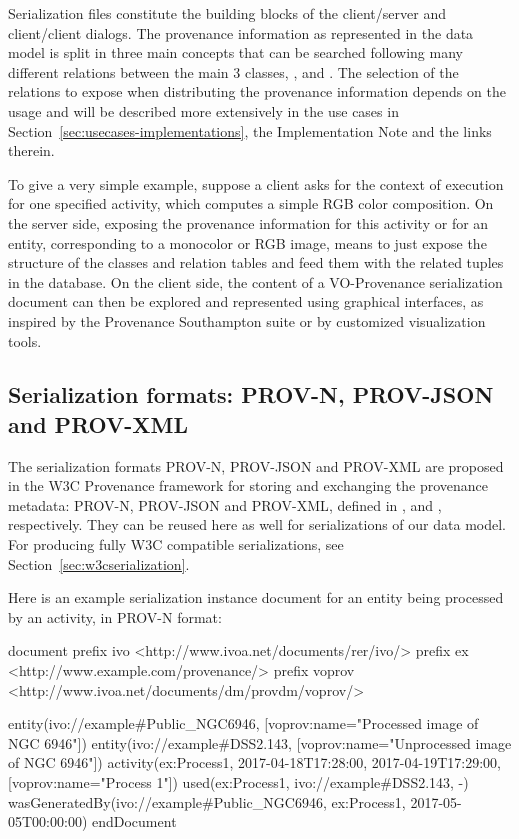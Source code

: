 Serialization files constitute the building blocks of the client/server and client/client dialogs.
The provenance information as represented in the data model is split in three main concepts that can be searched following many different relations between the main 3 classes, ,  and .
The selection of the relations to expose when distributing the provenance information depends on the usage and will be described more extensively in the use cases in Section~\ref{sec:usecases-implementations}, the Implementation Note \citep{std:ProvenanceImplementationNote} and the links therein.

To give a very simple example, suppose a client asks for the context of execution for one specified activity, which computes a simple RGB color composition. 
On the server side, exposing the provenance information for this activity or for an entity, corresponding to a monocolor or RGB image, means to just expose the structure of the classes and relation tables and feed them with the related tuples in the database.
On the client side, the content of a VO-Provenance serialization document can then be explored and represented using graphical interfaces, as inspired by the Provenance Southampton suite or by customized visualization tools.

\subsection{Serialization formats: PROV-N, PROV-JSON and PROV-XML} %
The serialization formats {PROV-N}, {PROV-JSON} and {PROV-XML} are proposed 
in the W3C Provenance framework for storing and exchanging the provenance metadata: {PROV-N}, {PROV-JSON} and {PROV-XML}, defined in \cite{std:PROV-N}, \cite{std:PROV-JSON} and \cite{std:PROV-XML}, respectively. 
They can be reused here as well for serializations of our data model. For producing fully W3C compatible serializations, see Section~\ref{sec:w3cserialization}.


Here is an example serialization instance document for an entity being processed by an activity, in PROV-N format:

\begin{verbnobox}[\scriptsize]

document
  prefix ivo <http://www.ivoa.net/documents/rer/ivo/>
  prefix ex <http://www.example.com/provenance/>
  prefix voprov <http://www.ivoa.net/documents/dm/provdm/voprov/>

  entity(ivo://example#Public_NGC6946, [voprov:name="Processed image of NGC 6946"])
  entity(ivo://example#DSS2.143, [voprov:name="Unprocessed image of NGC 6946"])
  activity(ex:Process1, 2017-04-18T17:28:00, 2017-04-19T17:29:00, [voprov:name="Process 1"])
  used(ex:Process1, ivo://example#DSS2.143, -)
  wasGeneratedBy(ivo://example#Public_NGC6946, ex:Process1, 2017-05-05T00:00:00)
endDocument

\end{verbnobox}

